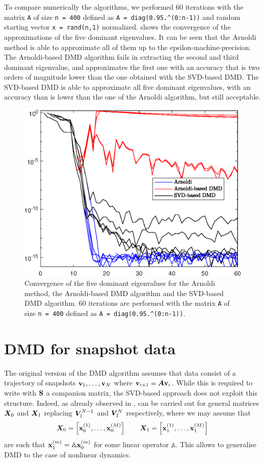 To compare numerically the algorithms, we performed 60 iterations with the matrix \texttt{A} of size \texttt{n = 400} defined as \texttt{A = diag(0.95.\^{}(0:n-1))} and random starting vector \texttt{x = rand(n,1)} normalized.  shows the convergence of the approximations of the five dominant eigenvalues. It can be seen that the Arnoldi method is able to approximate all of them up to the epsilon-machine-precision. The Arnoldi-based DMD algorithm fails in extracting the second and third dominant eigenvalue, and approximates the first one with an accuracy that is two orders of magnitude lower than the one obtained with the SVD-based DMD. The SVD-based DMD is able to approximate all five dominant eigenvalues, with an accuracy than is lower than the one of the Arnoldi algorithm, but still acceptable. 
\begin{figure}[h]
    \centering
    \includegraphics[width=0.5\linewidth]{../code/figures/Arnoldi_vs_DMD.eps}
    \caption{Convergence of the five dominant eigenvalues for the Arnoldi method, the Arnoldi-based DMD algorithm and the SVD-based DMD algorithm. 60 iterations are performed with the matrix \texttt{A} of size \texttt{n = 400} defined as \texttt{A = diag(0.95.\^{}(0:n-1))}.}
    \label{fig_arnoldi_vs_DMD}
\end{figure}

\section{DMD for snapshot data}
The original version of the DMD algorithm \cite{schmid_dynamic_2010} assumes that data consist of a trajectory of snapshots $\vb{v}_1, \dots, \vb{v}_N$ where $\vb{v}_{i+1} = \vb*{A}\vb{v}_{i}$. While this is required to write  with $\vb{S}$ a companion matrix, the SVD-based approach does not exploit this structure. Indeed, as already observed in \cite{tu_dynamic_2014},  can be carried out for general matrices $\vb*{X}_0$ and $\vb*{X}_1$ replacing $\vb*{V}_1^{N-1}$ and $\vb*{V}_2^{N}$ respectively, where we may assume that
\begin{equation}
    \label{dmd_matrices}
    \vb*{X}_0 = \left[\vb{x}_0^{(1)}, \dots, \vb{x}_0^{(M)}\right] \qquad \vb*{X}_1 = \left[\vb{x}_1^{(1)}, \dots, \vb{x}_1^{(M)}\right]
\end{equation}
are such that $\vb{x}_1^{(m)} = \mathbb{A}\vb{x}_0^{(m)}$ for some linear operator $\mathbb{A}$. This allows to generalise DMD to the case of nonlinear dynamics.

